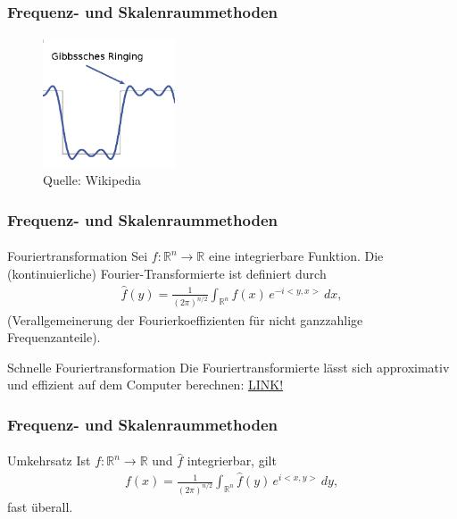 \documentclass{beamer}
\begin{document}
\begin{frame}
    \frametitle{Frequenz- und Skalenraummethoden}
\framesubtitle{}

\begin{figure}[htp]
      \centering
    \includegraphics[width=0.35\textwidth]{img/Gibb}
      \caption{Quelle: Wikipedia}
\end{figure}

 \end{frame}



\begin{frame}
    \frametitle{Frequenz- und Skalenraummethoden}
\framesubtitle{}

\begin{block}{Fouriertransformation}
Sei $f: \mathbb{R}^n \to \mathbb{R}$ eine integrierbare Funktion. Die (kontinuierliche) Fourier-Transformierte ist definiert durch
\begin{align*}
\hat{ f}(y) = \frac{1}{\left(2\pi \right)^{n/2}} \int_{\mathbb{R}^n} f(x)\,e^{-i  <y, x>} \, d x,
\end{align*}
(Verallgemeinerung der Fourierkoeffizienten für nicht ganzzahlige Frequenzanteile).
\end{block}
\begin{block}{Schnelle Fouriertransformation}
Die Fouriertransformierte lässt sich approximativ und effizient auf dem Computer  berechnen:
\href{https://en.wikipedia.org/wiki/Fast_Fourier_transform}{LINK!}
\end{block}
 \end{frame}


\begin{frame}
    \frametitle{Frequenz- und Skalenraummethoden}
\framesubtitle{}

\begin{block}{Umkehrsatz}
Ist $f: \mathbb{R}^n  \to  \mathbb{R}$ und $\hat{ f}$ integrierbar, gilt
\begin{align*}
f(x) = \frac{1}{\left(2\pi \right)^{n/2}} \int_{\mathbb{R}^n}\hat{ f}(y) \,e^{i  <x, y>} \, d y,
\end{align*}
fast überall.
\end{block}
 \end{frame}
\end{document}
